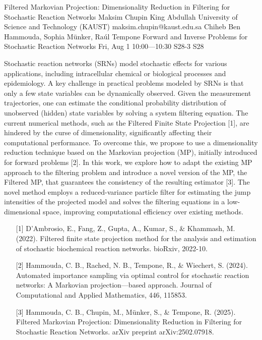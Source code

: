 \begin{talk}
  {Filtered Markovian Projection: Dimensionality Reduction in Filtering for Stochastic Reaction Networks}%
  {Maksim Chupin}%
  {King Abdullah University of Science and Technology (KAUST)}%
  {maksim.chupin@kaust.edu.sa}%
  {Chiheb Ben Hammouda, Sophia M\"{u}nker, Ra\'{u}l Tempone}%
  {Forward and Inverse Problems for Stochastic Reaction Networks}%
  {Fri, Aug 1 10:00---10:30}%
  {S28-3}%
  {S28}%
    
   
Stochastic reaction networks (SRNs) model stochastic effects for various applications, including intracellular chemical or biological processes and epidemiology. A key challenge in practical problems modeled by SRNs is that only a few state variables can be dynamically observed. Given the measurement trajectories, one can estimate the conditional probability distribution of unobserved (hidden) state variables by solving a system filtering equation. The current numerical methods, such as the Filtered Finite State Projection [1], are hindered by the curse of dimensionality, significantly affecting their computational performance. To overcome this, we propose to use a dimensionality reduction technique based on the Markovian projection (MP), initially introduced for forward problems [2]. In this work, we explore how to adapt the existing MP approach to the filtering problem and introduce a novel version of the MP, the Filtered MP, that guarantees the consistency of the resulting estimator [3]. The novel method employs a reduced-variance particle filter for estimating the jump intensities of the projected model and solves the filtering equations in a low-dimensional space, improving computational efficiency over existing methods.





\medskip

\begin{enumerate}
 \item[{[1]}] D’Ambrosio, E., Fang, Z., Gupta, A., Kumar, S., \& Khammash, M. (2022). Filtered finite state projection method for the analysis and estimation of stochastic biochemical reaction networks. bioRxiv, 2022-10.
 \item[{[2]}] Hammouda, C. B., Rached, N. B., Tempone, R., \& Wiechert, S. (2024). Automated importance sampling via optimal control for stochastic reaction networks: A Markovian projection---based approach. Journal of Computational and Applied Mathematics, 446, 115853.
    \item [{[3]}] Hammouda, C. B., Chupin, M., M\"unker, S., \& Tempone, R. (2025). Filtered Markovian Projection: Dimensionality Reduction in Filtering for Stochastic Reaction Networks. arXiv preprint arXiv:2502.07918.
\end{enumerate}


\end{talk}

